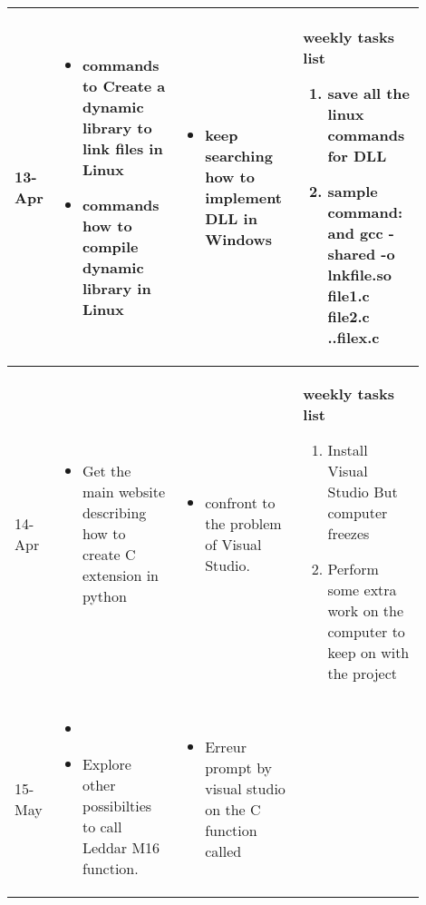 \begin{longtable}{|l|p{0.3\linewidth}|p{0.3\linewidth}|p{0.3\linewidth}|}
			\\\hline
			
					13-Apr	&
\begin{itemize}
\item commands to Create a dynamic library to link files in Linux
\item  commands how to compile dynamic library in Linux 
\end{itemize}
			&
\begin{itemize}
\item    keep searching how to implement DLL in Windows  
\end{itemize}			
			
			&
			\textbf{ weekly tasks list}
	\begin{enumerate}
	\item  save all the linux commands for DLL
	\item  sample command:  and gcc -shared -o  lnkfile.so file1.c file2.c  ..filex.c
	\end{enumerate}

			\\\hline
			
					14-Apr	&
\begin{itemize}
\item Get the main website describing how to create C extension in python
 
\end{itemize}
			&
\begin{itemize}
\item confront to the problem of Visual Studio.  
\end{itemize}			
			
			&
			\textbf{ weekly tasks list}
	\begin{enumerate}
	\item  Install Visual Studio But computer freezes 
	\item Perform some extra work on the computer to keep on with the project
	
	\end{enumerate}

			\\\hline
			
					15-May	&
\begin{itemize}
\item 
\item Explore other possibilties to call Leddar M16 function.
\end{itemize}
			&
\begin{itemize}
\item  Erreur prompt by visual studio on the C function called
\end{itemize}			
			

\end{longtable}
